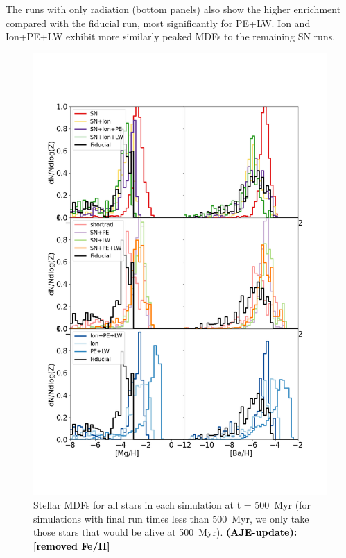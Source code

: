 \documentclass[twocolumn]{aastex62}
\newcommand{\changed}[1]{\textcolor{black}{\textbf{(AJE-update): #1}}}
\begin{document}
The runs with only radiation (bottom panels) also show the higher enrichment compared with the fiducial run, most significantly for PE+LW. Ion and Ion+PE+LW exhibit more similarly peaked MDFs to the remaining SN runs.

\begin{figure}
  \centering
  \includegraphics[width=1.1\linewidth]{figures/MgH_BaH_stellar_MDFs}
  \caption{Stellar MDFs for all stars in each simulation at t = 500~Myr (for simulations with final run times less than 500~Myr, we only take those stars that would be alive at 500~Myr). \changed{[removed Fe/H]}}
  \label{fig:MDF1}
\end{figure}
\end{document}
